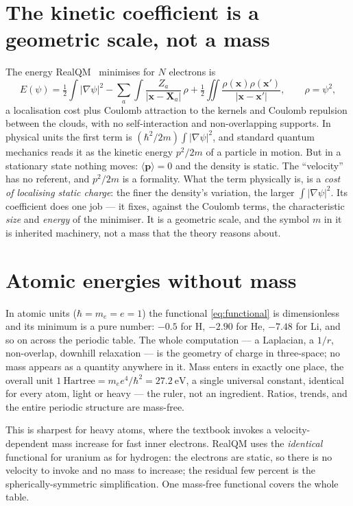 \documentclass[11pt]{article}
\begin{document}
\section{The kinetic coefficient is a geometric scale, not a mass}
The energy RealQM~\cite{RealQM} minimises for $N$ electrons is
\begin{equation}
E(\psi)=\tfrac12\int|\nabla\psi|^2
        -\sum_a\int\frac{Z_a}{|\mathbf x-\mathbf X_a|}\,\rho
        +\tfrac12\iint\frac{\rho(\mathbf x)\rho(\mathbf x')}{|\mathbf x-\mathbf x'|},
\qquad \rho=\psi^2,
\label{eq:functional}
\end{equation}
a localisation cost plus Coulomb attraction to the kernels and Coulomb repulsion between the clouds, with no
self-interaction and non-overlapping supports. In physical units the first term is $(\hbar^2/2m)\int|\nabla\psi|^2$,
and standard quantum mechanics reads it as the kinetic energy $p^2/2m$ of a particle in motion. But in a
stationary state nothing moves: $\langle\mathbf p\rangle=0$ and the density is static. The ``velocity'' has no
referent, and $p^2/2m$ is a formality. What the term physically is, is a \emph{cost of localising static charge}:
the finer the density's variation, the larger $\int|\nabla\psi|^2$. Its coefficient does one job --- it fixes,
against the Coulomb terms, the characteristic \emph{size} and \emph{energy} of the minimiser. It is a geometric
scale, and the symbol $m$ in it is inherited machinery, not a mass that the theory reasons about.

\section{Atomic energies without mass}
In atomic units ($\hbar=m_e=e=1$) the functional \eqref{eq:functional} is dimensionless and its minimum is a pure
number: $-0.5$ for H, $-2.90$ for He, $-7.48$ for Li, and so on across the periodic table. The whole computation ---
a Laplacian, a $1/r$, non-overlap, downhill relaxation --- is the geometry of charge in three-space; no mass
appears as a quantity anywhere in it. Mass enters in exactly one place, the overall unit
$1~\mathrm{Hartree}=m_e e^4/\hbar^2 = 27.2~\mathrm{eV}$, a single universal constant, identical for every atom,
light or heavy --- the ruler, not an ingredient. Ratios, trends, and the entire periodic structure are mass-free.

This is sharpest for heavy atoms, where the textbook invokes a velocity-dependent mass increase for fast inner
electrons. RealQM uses the \emph{identical} functional for uranium as for hydrogen: the electrons are static, so
there is no velocity to invoke and no mass to increase; the residual few percent is the spherically-symmetric
simplification. One mass-free functional covers the whole table.
\end{document}
